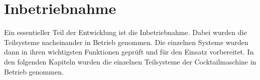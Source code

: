 \section{Inbetriebnahme}
\label{sec:Inbetriebnahme}

Ein essentieller Teil der Entwicklung ist die Inbetriebnahme. Dabei wurden die Teilsysteme nacheinander in Betrieb genommen. Die einzelnen Systeme wurden dann in ihren wichtigsten Funktionen geprüft und für den Einsatz vorbereitet. In den folgenden Kapiteln wurden die einzelnen Teilsysteme der Cocktailmaschine in Betrieb genommen. 